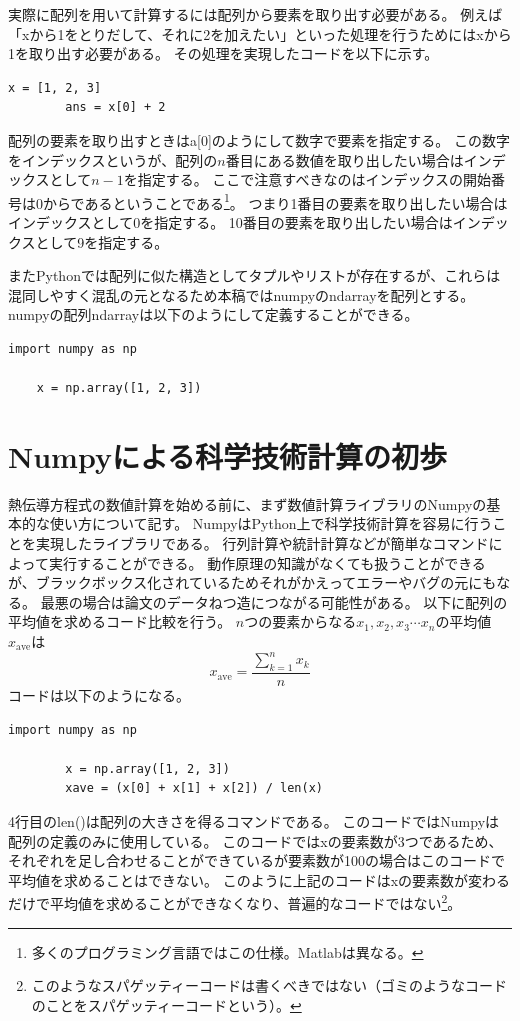 \documentclass[]{article}
\begin{document}
	実際に配列を用いて計算するには配列から要素を取り出す必要がある。
	例えば「xから1をとりだして、それに2を加えたい」といった処理を行うためにはxから1を取り出す必要がある。
	その処理を実現したコードを以下に示す。
	\begin{lstlisting}[caption=array.py, label=array2]
		x = [1, 2, 3]
		ans = x[0] + 2
	\end{lstlisting}
	配列の要素を取り出すときはa[0]のようにして数字で要素を指定する。
	この数字をインデックスというが、配列の$n$番目にある数値を取り出したい場合はインデックスとして$n-1$を指定する。
	ここで注意すべきなのはインデックスの開始番号は0からであるということである\footnote{多くのプログラミング言語ではこの仕様。Matlabは異なる。}。
	つまり1番目の要素を取り出したい場合はインデックスとして0を指定する。
	10番目の要素を取り出したい場合はインデックスとして9を指定する。

	またPythonでは配列に似た構造としてタプルやリストが存在するが、これらは混同しやすく混乱の元となるため本稿ではnumpyのndarrayを配列とする。
	numpyの配列ndarrayは以下のようにして定義することができる。
	\begin{lstlisting}[caption=numpyarray.py, label=ndarray]
	import numpy as np

	x = np.array([1, 2, 3])
	\end{lstlisting}


	\section{Numpyによる科学技術計算の初歩}
	熱伝導方程式の数値計算を始める前に、まず数値計算ライブラリのNumpyの基本的な使い方について記す。
	NumpyはPython上で科学技術計算を容易に行うことを実現したライブラリである。
	行列計算や統計計算などが簡単なコマンドによって実行することができる。
	動作原理の知識がなくても扱うことができるが、ブラックボックス化されているためそれがかえってエラーやバグの元にもなる。
	最悪の場合は論文のデータねつ造につながる可能性がある。
	以下に配列の平均値を求めるコード比較を行う。
	$n$つの要素からなる$x_1, x_2, x_3 \cdots x_n$の平均値$x_\mathrm{ave}$は
	\begin{equation}
	x_\mathrm{ave} = \frac{\displaystyle{\sum_{k=1}^{n}x_k}}{n}
	\end{equation}
	コードは以下のようになる。
	\begin{lstlisting}[caption=average.py, label=average]
		import numpy as np

		x = np.array([1, 2, 3])
		xave = (x[0] + x[1] + x[2]) / len(x) 
	\end{lstlisting}
	4行目のlen()は配列の大きさを得るコマンドである。
	このコードではNumpyは配列の定義のみに使用している。
	このコードではxの要素数が3つであるため、それぞれを足し合わせることができているが要素数が100の場合はこのコードで平均値を求めることはできない。
	このように上記のコードはxの要素数が変わるだけで平均値を求めることができなくなり、普遍的なコードではない\footnote{このようなスパゲッティーコードは書くべきではない（ゴミのようなコードのことをスパゲッティーコードという）。}。
\end{document}
